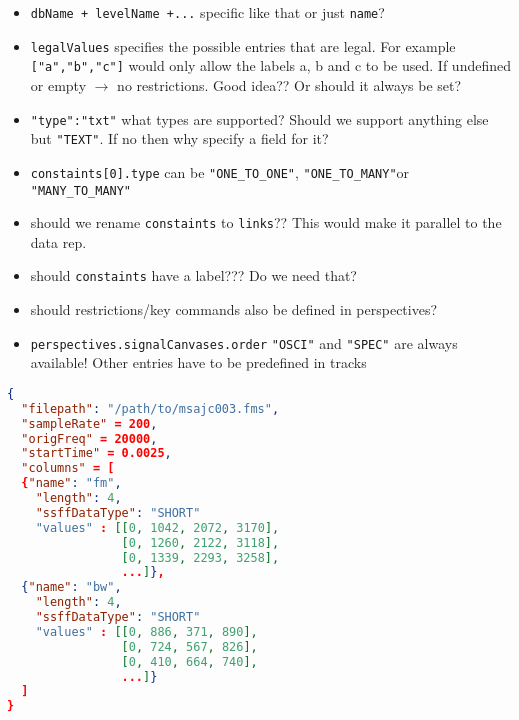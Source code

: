 \documentclass[A4,12pt, utf8]{article}
\begin{document}



\begin{itemize}
  \item \texttt{dbName + levelName +...} specific like that or just \texttt{name}?
  \item \texttt{legalValues} specifies the possible entries that are legal. For example \texttt{["a","b","c"]} would only allow the labels a, b and c to be used. If undefined or empty $\rightarrow$ no restrictions. Good idea?? Or should it always be set?
  \item \texttt{"type":"txt"} what types are supported? Should we support anything else but \texttt{"TEXT"}. If no then why specify a field for it?
  \item \texttt{constaints[0].type} can be \texttt{"ONE\_TO\_ONE"}, \texttt{"ONE\_TO\_MANY"}or \texttt{"MANY\_TO\_MANY"}
  \item should we rename \texttt{constaints} to \texttt{links}?? This would make it parallel to the data rep.
  \item should \texttt{constaints} have a label??? Do we need that?
  \item should restrictions/key commands also be defined in perspectives?
  \item \texttt{perspectives.signalCanvases.order} \texttt{"OSCI"} and \texttt{"SPEC"} are always available! Other entries have to be predefined in tracks 
\end{itemize}





\begin{lstlisting}[caption=EMU-webApp internal derived signal representation, label=idsr, language=json,firstnumber=1]
{
  "filepath": "/path/to/msajc003.fms",
  "sampleRate" = 200,
  "origFreq" = 20000,
  "startTime" = 0.0025,
  "columns" = [
  {"name": "fm",
    "length": 4,
    "ssffDataType": "SHORT"
    "values" : [[0, 1042, 2072, 3170],
                [0, 1260, 2122, 3118],
                [0, 1339, 2293, 3258],
                ...]},
  {"name": "bw",
    "length": 4,
    "ssffDataType": "SHORT"
    "values" : [[0, 886, 371, 890],
                [0, 724, 567, 826],
                [0, 410, 664, 740],
                ...]}
  ]
}
\end{lstlisting}
\end{document}
